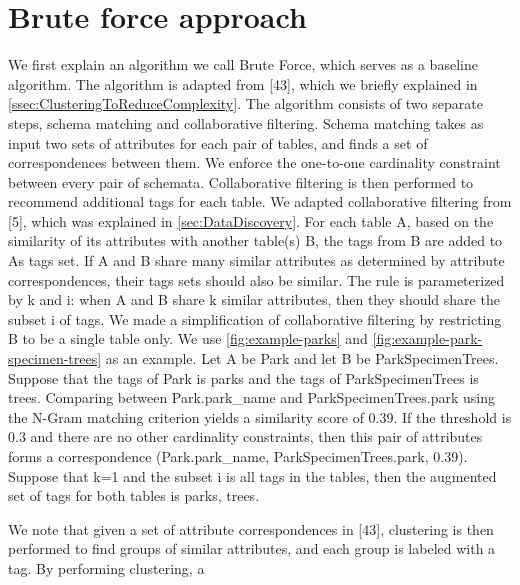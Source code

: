 \section{Brute force approach}
\label{sec:BruteForceApproach}

We first explain an algorithm we call Brute Force, which serves as a baseline algorithm. The algorithm is adapted from \cite{Smith2011Unity}[43], which we briefly explained in \autoref{ssec:ClusteringToReduceComplexity}. The algorithm consists of two separate steps, schema matching and collaborative filtering. Schema matching takes as input two sets of attributes for each pair of tables, and finds a set of correspondences between them. We enforce the one-to-one cardinality constraint between every pair of schemata. Collaborative filtering is then performed to recommend additional tags for each table. We adapted collaborative filtering from \cite{conf/esws/EllefiBDT16}[5], which was explained in \autoref{sec:DataDiscovery}. For each table A, based on the similarity of its attributes with another table(s) B, the tags from B are added to As tags set. If A and B share many similar attributes as determined by attribute correspondences, their tags sets should also be similar. The rule is parameterized by k and i: when A and B share k similar attributes, then they should share the subset i of tags. We made a simplification of collaborative filtering by restricting B to be a single table only.
We use \autoref{fig:example-parks} and \autoref{fig:example-park-specimen-trees} as an example. Let A be Park and let B be ParkSpecimenTrees. Suppose that the tags of Park is {parks} and the tags of ParkSpecimenTrees is {trees}. Comparing between Park.park\_name and ParkSpecimenTrees.park using the N-Gram matching criterion yields a similarity score of 0.39. If the threshold is 0.3 and there are no other cardinality constraints, then this pair of attributes forms a correspondence (Park.park\_name, ParkSpecimenTrees.park, 0.39). Suppose that k=1 and the subset i is all tags in the tables, then the augmented set of tags for both tables is {parks, trees}.


We note that given a set of attribute correspondences in \cite{Smith2011Unity}[43], clustering is then performed to find groups of similar attributes, and each group is labeled with a tag. By performing clustering, a

